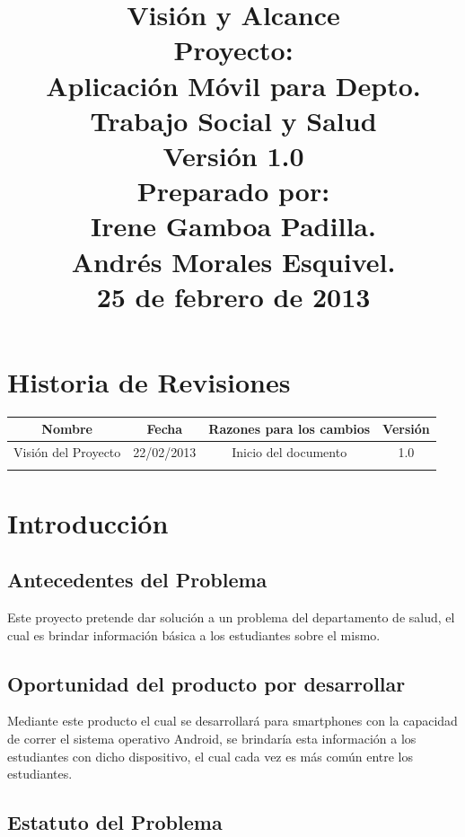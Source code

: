\documentclass[12pt]{article}
\title{\begin{flushright}\textbf{Visi\'on y Alcance} \\[0.7in] 
		Proyecto: \\[0.2in]
		\textbf{Aplicaci\'on M\'ovil para Depto. Trabajo Social y Salud}\\[0.7in]
		Versi\'on 1.0 \\[0.7in]
		Preparado por: \\[0.2in]
		\textbf{Irene Gamboa Padilla.\\
		Andr\'es Morales Esquivel.} \\[0.7in]
		25 de febrero de 2013
		\end{flushright}}
\author{}
\date{}
\begin{document}
\maketitle
\newpage
\renewcommand{\contentsname}{Tabla de Contenido}
\tableofcontents


\section{Historia de Revisiones}

\begin{tabular}{|c|c|c|c|}
\hline
	\textbf{Nombre} & \textbf{Fecha} & \textbf{Razones para los cambios} & \textbf{Versi\'on}\\
\hline
	Visi\'on del Proyecto & 22/02/2013 & Inicio del documento & 1.0\\
\hline
	 &  &  & \\
\hline
\end{tabular}

\newpage

\section{Introducci\'on}

\subsection{Antecedentes del Problema}

Este proyecto pretende dar soluci\'on a un problema del departamento de salud, el cual es brindar informaci\'on b\'asica a los estudiantes sobre el mismo.

\subsection{Oportunidad del producto por desarrollar}

Mediante este producto el cual se desarrollar\'a para smartphones con la capacidad de correr el sistema operativo Android, se brindar\'ia esta informaci\'on a los estudiantes con dicho dispositivo, el cual cada vez es m\'as com\'un entre los estudiantes.

\subsection{Estatuto del Problema}
\end{document}
